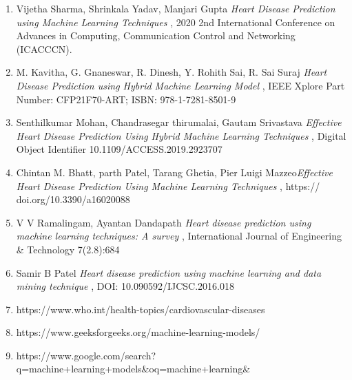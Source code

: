 \documentclass[12pt]{article}
\begin{document}
\begin{enumerate}
    \item Vijetha Sharma, Shrinkala Yadav, Manjari Gupta \textit{Heart Disease Prediction using Machine
Learning Techniques
}, 2020 2nd International Conference on Advances in Computing, Communication Control and Networking (ICACCCN).
    \item M. Kavitha, G. Gnaneswar, R. Dinesh, Y. Rohith Sai, R. Sai Suraj \textit{Heart Disease Prediction using Hybrid Machine
Learning Model
}, IEEE Xplore Part Number: CFP21F70-ART; ISBN: 978-1-7281-8501-9
\item Senthilkumar Mohan, Chandrasegar thirumalai, Gautam Srivastava \textit{Effective Heart Disease Prediction Using
Hybrid Machine Learning Techniques
}, Digital Object Identifier 10.1109/ACCESS.2019.2923707
\item Chintan M. Bhatt, parth Patel, Tarang Ghetia, Pier Luigi Mazzeo\textit{Effective Heart Disease Prediction Using Machine
Learning Techniques
}, https://
doi.org/10.3390/a16020088

\item V V Ramalingam, Ayantan Dandapath
\textit{Heart disease prediction using machine learning techniques: A survey
}, International Journal of Engineering \& Technology 7(2.8):684

\item Samir B Patel
\textit{Heart disease prediction using machine learning and data mining technique
}, DOI: 10.090592/IJCSC.2016.018
\item https://www.who.int/health-topics/cardiovascular-diseases
\item https://www.geeksforgeeks.org/machine-learning-models/
\item https://www.google.com/search?q=machine+learning+models\&oq=machine+learning\&
\end{enumerate}
\end{document}
